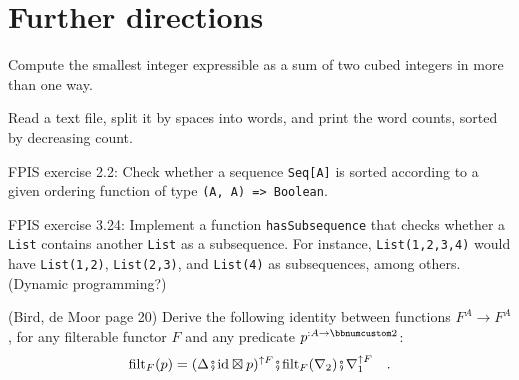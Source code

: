 
\chapter{Further directions }

Compute the smallest integer expressible as a sum of two cubed integers
in more than one way.

Read a text file, split it by spaces into words, and print the word
counts, sorted by decreasing count.

FPIS exercise 2.2: Check whether a sequence \lstinline!Seq[A]! is
sorted according to a given ordering function of type \lstinline!(A, A) => Boolean!.

FPIS exercise 3.24: Implement a function \lstinline!hasSubsequence!
that checks whether a \lstinline!List! contains another \lstinline!List!
as a subsequence. For instance, \lstinline!List(1,2,3,4)! would have
\lstinline!List(1,2)!, \lstinline!List(2,3)!, and \lstinline!List(4)!
as subsequences, among others. (Dynamic programming?)

(Bird, de Moor page 20) Derive the following identity between functions
$F^{A}\rightarrow F^{A}$, for any filterable functor $F$ and any
predicate $p^{:A\rightarrow\bbnum 2}$: 
\[
\text{filt}_{F}(p)=(\Delta\bef\text{id}\boxtimes p)^{\uparrow F}\bef\text{filt}_{F}(\nabla_{2})\bef\nabla_{1}^{\uparrow F}\quad.
\]

